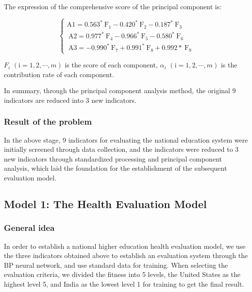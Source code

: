 \documentclass[12pt]{article}  %
\begin{document}
The expression of the comprehensive score of the principal component is:

\begin{equation}\label{eq:heat3}\left\{\begin{array}{l}
\mathrm{A} 1=0.563^{*} \mathrm{~F}_{1}-0.420^{*} \mathrm{~F}_{2}-0.187^{*} \mathrm{~F}_{3} \\
\mathrm{~A} 2=0.977^{*} \mathrm{~F}_{4}-0.966^{*} \mathrm{~F}_{5}-0.580^{*} \mathrm{~F}_{6} \\
\mathrm{~A} 3=-0.990^{*} \mathrm{~F}_{7}+0.991^{*} \mathrm{~F}_{8}+0.992 * \mathrm{~F}_{9}
\end{array}\right.\end{equation}

$F_{i}$
$\left(\mathrm{i}=1, 2, \cdots, m\right)$ is the score of each component, $\alpha_{i}$
$\left(\mathrm{i}=1, 2, \cdots, m\right)$ is the contribution rate of each component.

In summary, through the principal component analysis method, the original 9 indicators are reduced into 3 new indicators.

\subsubsection{Result of the problem}

In the above stage, 9 indicators for evaluating the national education system were initially screened through data collection, and the indicators were reduced to 3 new indicators through standardized processing and principal component analysis, which laid the foundation for the establishment of the subsequent evaluation model.

\subsection{Model 1: The Health Evaluation  Model }
\subsubsection{General idea}
In order to establish a national higher education health evaluation model, we use the three indicators obtained above to establish an evaluation system through the BP neural network, and use standard data for training. When selecting the evaluation criteria, we divided the fitness into 5 levels, the United States as the highest level 5, and India as the lowest level 1 for training to get the final result.
\end{document}
